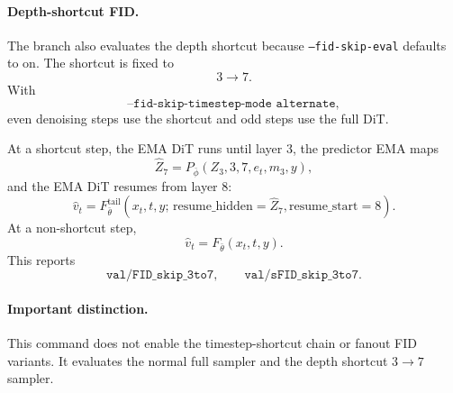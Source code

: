 \documentclass[11pt]{article}
\begin{document}
\paragraph{Depth-shortcut FID.}
The branch also evaluates the depth shortcut because \texttt{--fid-skip-eval}
defaults to on. The shortcut is fixed to
\[
  3\to7.
\]
With
\[
  \texttt{--fid-skip-timestep-mode alternate},
\]
even denoising steps use the shortcut and odd steps use the full DiT.

At a shortcut step, the EMA DiT runs until layer $3$, the predictor EMA maps
\[
  \hat Z_7
  =
  P_{\bar\phi}(Z_3,3,7,e_t,m_3,y),
\]
and the EMA DiT resumes from layer $8$:
\[
  \hat v_t
  =
  F_{\bar\theta}^{\mathrm{tail}}
  \left(
    x_t,t,y;\,
    \mathrm{resume\_hidden}=\hat Z_7,
    \mathrm{resume\_start}=8
  \right).
\]
At a non-shortcut step,
\[
  \hat v_t=F_{\bar\theta}(x_t,t,y).
\]
This reports
\[
  \texttt{val/FID\_skip\_3to7},\qquad
  \texttt{val/sFID\_skip\_3to7}.
\]

\paragraph{Important distinction.}
This command does not enable the timestep-shortcut chain or fanout FID variants.
It evaluates the normal full sampler and the depth shortcut $3\to7$ sampler.
\end{document}
